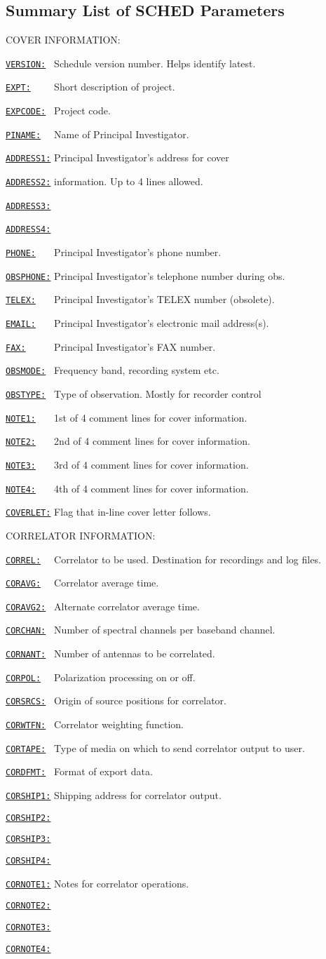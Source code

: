 \documentclass{report}
\newcommand{\htlm}[2]%
{\item
  \hyperref[MP:#1]{{\tt #1:}}{\tt #2}%
}
\newcommand{\htln}[3]%
{\item
  \hyperref[MP:#2]{{\tt #1:}}{\tt #3}%
}
\begin{document}
\subsection{\label{SSEC:PARLST}Summary List of SCHED Parameters}

COVER INFORMATION:

\begin{list}{}{\parsep 0em  \itemsep 0em }
\htlm{VERSION}{~} Schedule version number. Helps identify latest.
\htlm{EXPT}{~~~~} Short description of project.
\htlm{EXPCODE}{~} Project code.
\htlm{PINAME}{~~} Name of Principal Investigator.
\htlm{ADDRESS1}{} Principal Investigator's address for cover
\htln{ADDRESS2}{ADDRESS1}{} information. Up to 4 lines allowed.
\htln{ADDRESS3}{ADDRESS1}{} ~
\htln{ADDRESS4}{ADDRESS1}{} ~
\htlm{PHONE}{~~~} Principal Investigator's phone number.
\htlm{OBSPHONE}{} Principal Investigator's telephone number
                        during obs.
\htlm{TELEX}{~~~} Principal Investigator's TELEX number (obsolete).
\htlm{EMAIL}{~~~} Principal Investigator's electronic mail
                        address(s).
\htlm{FAX}{~~~~~} Principal Investigator's FAX number.
\htlm{OBSMODE}{~} Frequency band, recording system etc.
\htlm{OBSTYPE}{~} Type of observation. Mostly for recorder control
\htlm{NOTE1}{~~~} 1st of 4 comment lines for cover information.
\htln{NOTE2}{NOTE1}{~~~} 2nd of 4 comment lines for cover information.
\htln{NOTE3}{NOTE1}{~~~} 3rd of 4 comment lines for cover information.
\htln{NOTE4}{NOTE1}{~~~} 4th of 4 comment lines for cover information.
\htlm{COVERLET}{} Flag that in-line cover letter follows.
\end{list}




CORRELATOR INFORMATION:

\begin{list}{}{\parsep 0em  \itemsep 0em }
\htlm{CORREL}{~~} Correlator to be used.  Destination for recordings and log
                        files.
\htlm{CORAVG}{~~} Correlator average time.
\htlm{CORAVG2}{~} Alternate correlator average time.
\htlm{CORCHAN}{~} Number of spectral channels per baseband channel.
\htlm{CORNANT}{~} Number of antennas to be correlated.
\htlm{CORPOL}{~~} Polarization processing on or off.
\htlm{CORSRCS}{~} Origin of source positions for correlator.
\htlm{CORWTFN}{~} Correlator weighting function.
\htlm{CORTAPE}{~} Type of media on which to send correlator output to user.
\htlm{CORDFMT}{~} Format of export data.
\htln{CORSHIP1}{CORSHIP}{} Shipping address for correlator output.
\htln{CORSHIP2}{CORSHIP}{}
\htln{CORSHIP3}{CORSHIP}{}
\htln{CORSHIP4}{CORSHIP}{}
\htln{CORNOTE1}{CORNOTE}{} Notes for correlator operations.
\htln{CORNOTE2}{CORNOTE}{}
\htln{CORNOTE3}{CORNOTE}{}
\htln{CORNOTE4}{CORNOTE}{}
\end{list}
\end{document}
